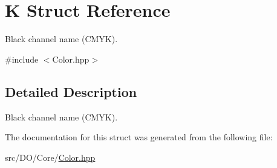 \hypertarget{struct_d_o_1_1_k}{\section{K Struct Reference}
\label{struct_d_o_1_1_k}
}


Black channel name (C\-M\-Y\-K).  




{\ttfamily \#include $<$Color.\-hpp$>$}



\subsection{Detailed Description}
Black channel name (C\-M\-Y\-K). 

The documentation for this struct was generated from the following file\-:\begin{DoxyCompactItemize}
\item 
src/\-D\-O/\-Core/\hyperlink{_color_8hpp}{Color.\-hpp}\end{DoxyCompactItemize}
